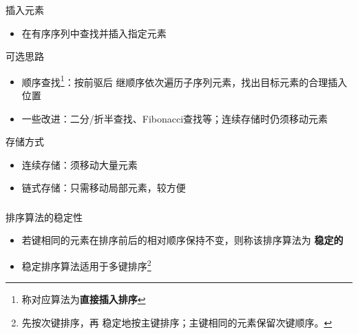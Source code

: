 \begin{frame}
    \frametitle{\insertsectionhead}
    \begin{block}{插入元素}
        \begin{itemize}
            \item 在\alert{有序序列}中\alert{查找}并\alert{插入}指定元素
        \end{itemize}
    \end{block}
    \begin{block}{可选思路}
        \begin{itemize}
            \item 顺序查找\footnote{称对应算法为\textbf{直接插入排序}}：按前驱后
                  继顺序依次遍历子序列元素，找出目标元素的合理插入位置
            \item 一些改进：二分/折半查找、Fibonacci查找等；连续存储时仍须移动元素
        \end{itemize}
    \end{block}
    \begin{block}{存储方式}
        \begin{itemize}
            \item 连续存储：须移动大量元素
            \item 链式存储：只需移动局部元素，较方便
        \end{itemize}
    \end{block}
\end{frame}

\begin{frame}
    \frametitle{\insertsectionhead}
    \begin{alertblock}{排序算法的稳定性}
        \begin{itemize}
            \item 若键相同的元素在排序前后的相对顺序保持不变，则称该排序算法为
                  \textbf{稳定的}
            \item 稳定排序算法适用于\alert{多键排序}\footnote{先按次键排序，再
                      稳定地按主键排序；主键相同的元素保留次键顺序。}
        \end{itemize}
    \end{alertblock}
\end{frame}

